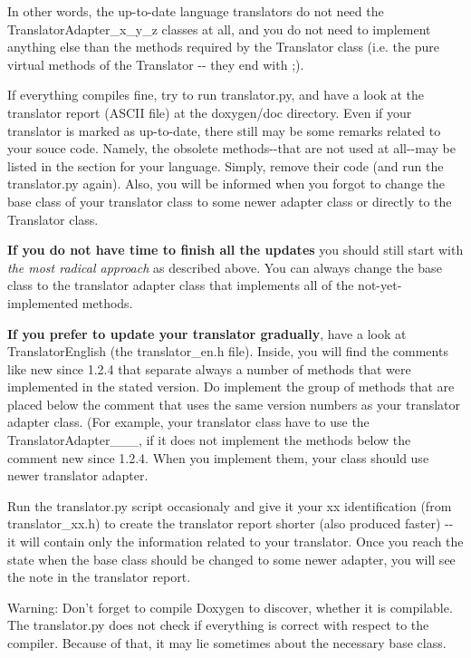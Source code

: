In other words, the up-\/to-\/date language translators do not need the {\ttfamily TranslatorAdapter\_\-x\_\-y\_\-z} classes at all, and you do not need to implement anything else than the methods required by the Translator class (i.e. the pure virtual methods of the {\ttfamily Translator} -\/-\/ they end with {;}).

If everything compiles fine, try to run {\ttfamily translator.py}, and have a look at the translator report (ASCII file) at the {\ttfamily doxygen/doc} directory. Even if your translator is marked as up-\/to-\/date, there still may be some remarks related to your souce code. Namely, the obsolete methods-\/-\/that are not used at all-\/-\/may be listed in the section for your language. Simply, remove their code (and run the {\ttfamily translator.py} again). Also, you will be informed when you forgot to change the base class of your translator class to some newer adapter class or directly to the Translator class.

{\bfseries If you do not have time to finish all the updates} you should still start with {\itshape the most radical approach\/} as described above. You can always change the base class to the translator adapter class that implements all of the not-\/yet-\/implemented methods.

{\bfseries If you prefer to update your translator gradually}, have a look at {\ttfamily TranslatorEnglish} (the {\ttfamily translator\_\-en.h} file). Inside, you will find the comments like {\ttfamily new since 1.2.4} that separate always a number of methods that were implemented in the stated version. Do implement the group of methods that are placed below the comment that uses the same version numbers as your translator adapter class. (For example, your translator class have to use the {\ttfamily TranslatorAdapter\_\_\_}, if it does not implement the methods below the comment {\ttfamily new since 1.2.4}. When you implement them, your class should use newer translator adapter.

Run the {\ttfamily translator.py} script occasionaly and give it your {\ttfamily xx} identification (from {\ttfamily translator\_\-xx.h}) to create the translator report shorter (also produced faster) -\/-\/ it will contain only the information related to your translator. Once you reach the state when the base class should be changed to some newer adapter, you will see the note in the translator report.

Warning: Don't forget to compile Doxygen to discover, whether it is compilable. The {\ttfamily translator.py} does not check if everything is correct with respect to the compiler. Because of that, it may lie sometimes about the necessary base class.

